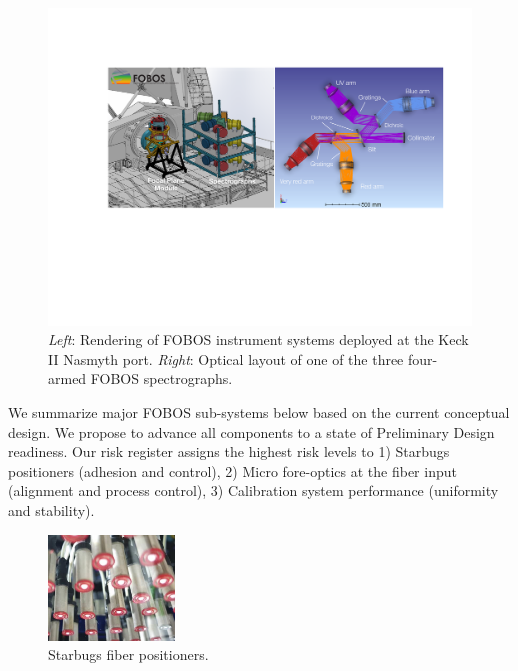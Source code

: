 \documentclass[oneside,11pt]{amsart}
\begin{document}
\begin{figure}[h!]
%
\vskip -0.1in
%
\includegraphics[width=\textwidth]{figs/FOBOS_inst_2019-10-28.pdf}
%
\caption{\small {\it Left}: Rendering of FOBOS instrument systems
deployed at the Keck II Nasmyth port.  {\it Right}: Optical layout of one of
the three four-armed FOBOS spectrographs.}
%
\label{fig:layout}
%
\end{figure}

We summarize major FOBOS sub-systems below based on the current conceptual design.  We propose to advance all components to a state of Preliminary Design readiness.  Our risk register assigns the highest risk levels to 1) Starbugs positioners (adhesion and control), 2) Micro fore-optics at the fiber input (alignment and process control), 3) Calibration system performance (uniformity and stability).

\begin{figure}\small
%
\includegraphics[width=0.3\textwidth]{figs/starbugs_v1.jpg}
%
\caption{Starbugs fiber positioners.}
%
\label{fig:org}
%
\end{figure}
\end{document}
